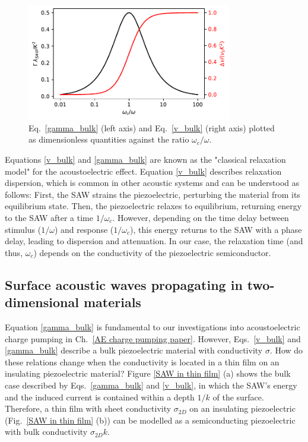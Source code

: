 \documentclass[double,12pt,1in,seploa]{beavtex}
\let\Oldsubsection\subsection
\renewcommand{\subsection}{\FloatBarrier\Oldsubsection}
\begin{document}
\begin{figure}
    \includegraphics[width=0.8\textwidth]{gamma_and_v.pdf}
    \caption{Eq.\ \ref{gamma_bulk} (left axis) and Eq.\ \ref{v_bulk} (right axis) plotted as dimensionless quantities against the ratio $\omega_c/\omega$.}
    \label{gamma_and_v}
\end{figure}

Equations \ref{v_bulk} and \ref{gamma_bulk} are known as the "classical relaxation model" for the acoustoelectric effect. Equation \ref{v_bulk} describes relaxation dispersion, which is common in other acoustic systems \cite{hutson_elastic_1962, rudenko_dispersive_2022} and can be understood as follows: First, the SAW strains the piezoelectric, perturbing the material from its equilibrium state. Then, the piezoelectric relaxes to equilibrium, returning energy to the SAW after a time $1/\omega_c$. However, depending on the time delay between stimulus ($1/\omega$) and response ($1/\omega_c$), this energy returns to the SAW with a phase delay, leading to dispersion and attenuation. In our case, the relaxation time (and thus, $\omega_c$) depends on the conductivity of the piezoelectric semiconductor. 

\subsection{Surface acoustic waves propagating in two-dimensional materials} \label{SAW theory, propagating in 2D materials}

Equation \ref{gamma_bulk} is fundamental to our investigations into acoustoelectric charge pumping in Ch.\ \ref{AE charge pumping paper}. However, Eqs.\ \ref{v_bulk} and \ref{gamma_bulk} describe a bulk piezoelectric material with conductivity $\sigma$. How do these relations change when the conductivity is located in a thin film on an insulating piezoelectric material? Figure \ref{SAW in thin film} (a) shows the bulk case described by Eqs.\ \ref{gamma_bulk} and \ref{v_bulk}, in which the SAW's energy and the induced current is contained within a depth $1/k$ of the surface. Therefore, a thin film with sheet conductivity $\sigma_{2D}$ on an insulating piezoelectric (Fig.\ \ref{SAW in thin film} (b)) can be modelled as a semiconducting piezoelectric with bulk conductivity $\sigma_{2D}k$.
\end{document}
